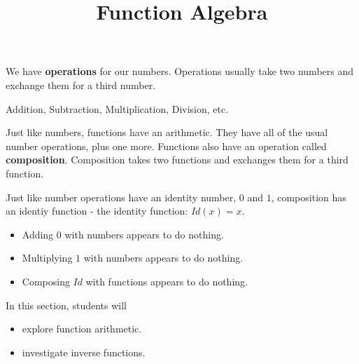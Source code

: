 \documentclass{ximera}
\title{Function Algebra}
\begin{document}
\begin{abstract}

\end{abstract}
\maketitle
















We have \textbf{operations} for our numbers.  Operations usually take two numbers and exchange them for a third number.

\begin{center}
Addition, Subtraction, Multiplication, Division, etc.
\end{center}



Just like numbers, functions have an arithmetic.  They have all of the usual number operations, plus one more.  Functions also have an operation called \textbf{composition}.  Composition takes two functions and exchanges them for a third function.

Just like number operations have an identity number, $0$ and $1$, composition has an identiy function - the identity function: $Id(x) = x$.


\begin{itemize}
\item Adding $0$ with numbers appears to do nothing.
\item Multiplying $1$ with numbers appears to do nothing.
\item Composing $Id$ with functions appears to do nothing.
\end{itemize}
















\begin{sectionOutcomes}
In this section, students will 

\begin{itemize}
\item explore function arithmetic.
\item investigate inverse functions.
\end{itemize}
\end{sectionOutcomes}
\end{document}
